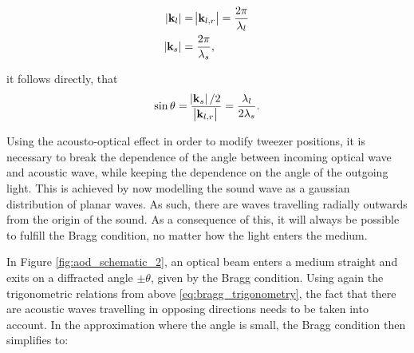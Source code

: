 \begin{align}
	\abs{\mathbf{k}_l} &= \abs{\mathbf{k}_{l,r}} = \frac{2\pi}{\lambda_l} \\
	\abs{\mathbf{k}_s} &= \frac{2\pi}{\lambda_s},
\end{align}

it follows directly, that
\begin{align}
	\label{eq:bragg_trigonometry}
	\sin{\theta} = \frac{\abs{\mathbf{k}_s} / 2}{\abs{\mathbf{k}_{l,r}}} = \frac{\lambda_l}{2\lambda_s}.
\end{align}

\begin{figure}[t]
\end{figure}



Using the acousto-optical effect in order to modify tweezer positions, it is necessary to break the dependence of the angle between incoming optical wave and acoustic wave, while keeping the dependence on the angle of the outgoing light. This is achieved by now modelling the sound wave as a gaussian distribution of planar waves. As such, there are waves travelling radially outwards from the origin of the sound. As a consequence of this, it will always be possible to fulfill the Bragg condition, no matter how the light enters the medium.

In Figure \ref{fig:aod_schematic_2}, an optical beam enters a medium straight and exits on a diffracted angle $\pm \theta$, given by the Bragg condition. Using again the trigonometric relations from above \ref{eq:bragg_trigonometry}, the fact that there are acoustic waves travelling in opposing directions needs to be taken into account. In the approximation where the angle is small, the Bragg condition then simplifies to:

